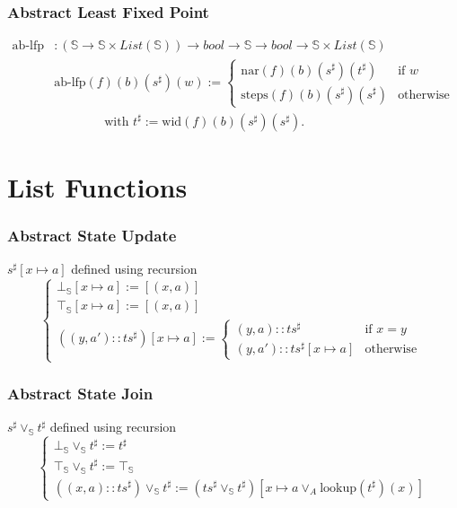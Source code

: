 \documentclass{beamer}
\begin{document}
        \begin{frame}
            \frametitle{Abstract Least Fixed Point}
            \begin{align*}
                \text{ab-lfp} &: (\mathbb{S} \to \mathbb{S} \times List(\mathbb{S})) \to bool \to \mathbb{S} \to bool \to \mathbb{S} \times List(\mathbb{S}) \\
                &\text{ab-lfp} (f) (b) (s^{\sharp}) (w) := \begin{cases}
                                                        \text{nar} (f) (b) (s^{\sharp}) (t^{\sharp})  & \text{if } w \\
                                                        \text{steps} (f) (b) (s^{\sharp}) (s^{\sharp}) & \text{otherwise}
                                                        \end{cases} \\
                & \qquad \qquad \text{with } t^{\sharp} := \text{wid} (f) (b) (s^{\sharp}) (s^{\sharp}).
            \end{align*}
            
        \end{frame}
        
\section{List Functions}



\begin{frame}
    \frametitle{Abstract State Update}
    \( s^{\sharp}[x \mapsto a] \) defined using recursion
    \[ 
        \begin{cases}
            \bot_\mathbb{S}[x \mapsto a] := [(x, a)] \\
            \top_\mathbb{S}[x \mapsto a] := [(x, a)] \\
            ((y, a') :: ts^{\sharp})[x \mapsto a] := \begin{cases}
                (y, a) :: {ts}^{\sharp} & \text{if } x = y \\
                (y, a') :: ts^{\sharp}[x \mapsto a] & \text{otherwise}
                \end{cases}
                                        \end{cases}
    \]
\end{frame}


\begin{frame}
    \frametitle{Abstract State Join}
    \( s^{\sharp} \vee_\mathbb{S} t^{\sharp}\) defined using recursion
    \[
    \begin{cases}
        \bot_\mathbb{S} \vee_\mathbb{S} t^{\sharp} := t^{\sharp} \\  
        \top_\mathbb{S} \vee_\mathbb{S} t^{\sharp} := \top_\mathbb{S} \\
        ((x, a) :: {ts}^{\sharp}) \vee_\mathbb{S} t^{\sharp} := ({ts}^{\sharp} \vee_\mathbb{S} t^{\sharp})[x \mapsto a \vee_A \text{lookup} (t^{\sharp}) (x)]
                                                    \end{cases} \]
\end{frame}
\end{document}
